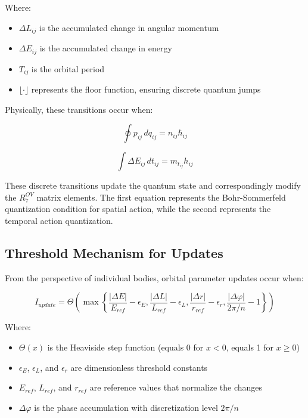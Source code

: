 \documentclass{article}
\begin{document}
Where:
\begin{itemize}
\item $\Delta L_{ij}$ is the accumulated change in angular momentum
\item $\Delta E_{ij}$ is the accumulated change in energy
\item $T_{ij}$ is the orbital period
\item $\lfloor \cdot \rfloor$ represents the floor function, ensuring discrete quantum jumps
\end{itemize}

Physically, these transitions occur when:

\begin{equation}
\oint p_{ij} \, dq_{ij} = n_{ij} \hbar_{ij}
\end{equation}

\begin{equation}
\int \Delta E_{ij} \, dt_{ij} = m_{t_{ij}} h_{ij}
\end{equation}

These discrete transitions update the quantum state and correspondingly modify the $R^{OV}_7$ matrix elements. The first equation represents the Bohr-Sommerfeld quantization condition for spatial action, while the second represents the temporal action quantization.

\subsection{Threshold Mechanism for Updates}

From the perspective of individual bodies, orbital parameter updates occur when:

\begin{equation}
I_{update} = \Theta\left(\max\left\{\frac{|\Delta E|}{E_{ref}} - \epsilon_E, \frac{|\Delta L|}{L_{ref}} - \epsilon_L, \frac{|\Delta r|}{r_{ref}} - \epsilon_r, \frac{|\Delta \varphi|}{2\pi/n} - 1\right\}\right)
\end{equation}

Where:
\begin{itemize}
\item $\Theta(x)$ is the Heaviside step function (equals 0 for $x < 0$, equals 1 for $x \geq 0$)
\item $\epsilon_E$, $\epsilon_L$, and $\epsilon_r$ are dimensionless threshold constants
\item $E_{ref}$, $L_{ref}$, and $r_{ref}$ are reference values that normalize the changes
\item $\Delta \varphi$ is the phase accumulation with discretization level $2\pi/n$
\end{itemize}
\end{document}
